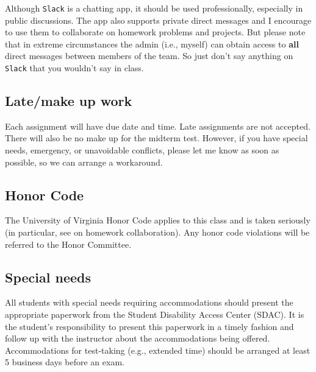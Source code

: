 \documentclass[oneside,11pt]{amsart}
\begin{document}
Although \texttt{Slack} is a chatting app, it should be used professionally,
especially in public discussions.  The app also supports private direct
messages and I encourage to use them to collaborate on homework problems and
projects. But please note that in extreme circumstances the admin (i.e.,
myself) can obtain access to \textbf{all} direct messages between members of
the team.  So just don't say anything on \texttt{Slack} that you wouldn't say
in class.


\subsection{Late/make up work} Each assignment will have due date and time.
Late assignments are not accepted. There will also be no make up for the midterm test.
However, if you have special needs, emergency, or unavoidable conflicts, please
let me know as soon as possible, so we can arrange a workaround.

\subsection{Honor Code} The University of Virginia Honor Code applies to this
class and is taken seriously (in particular, 
see  on homework collaboration).
Any honor code violations will be referred to the
Honor Committee.

\subsection{Special needs}

All students with special needs requiring accommodations should present the
appropriate paperwork from the Student Disability Access Center (SDAC). It is
the student's responsibility to present this paperwork in a timely fashion and
follow up with the instructor about the accommodations being offered.
Accommodations for test-taking (e.g., extended time) should be arranged at
least 5 business days before an exam.
\end{document}

